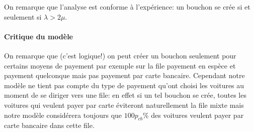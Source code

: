 \documentclass{scrartcl}
\begin{document}
        On remarque que l'analyse est conforme à l'expérience: un bouchon se
        crée si et seulement si $\lambda > 2\mu$.

      \paragraph{Critique du modèle}
        On remarque que (c'est logique!) on peut créer un bouchon seulement
        pour certains moyens de payement par exemple sur la file payement en
        espèce et payement quelconque mais pas payement par carte bancaire.
        Cependant notre modèle ne tient pas compte du type de payement qu'ont
        choisi les voitures au moment de se diriger vers une file: en effet si
        un tel bouchon se crée, toutes les voitures qui veulent payer par carte
        éviteront naturellement la file mixte mais notre modèle considérera
        toujours que $100 p_{cb}\%$ des voitures veulent payer par carte
        bancaire dans cette file.
\end{document}
